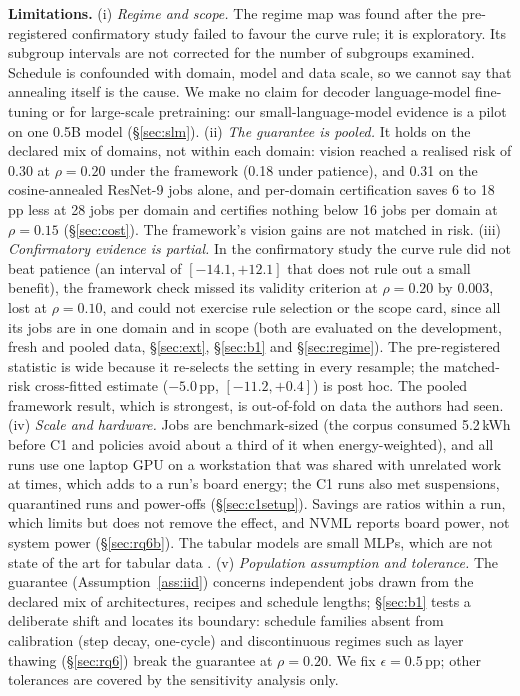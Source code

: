 \documentclass[3p,twocolumn,10pt]{elsarticle}
\theoremstyle{definition}
\begin{document}
\textbf{Limitations.}
(i) \emph{Regime and scope.} The regime map was found after the pre-registered confirmatory study failed to favour the curve rule; it is exploratory. Its subgroup intervals are not corrected for the number of subgroups examined. Schedule is confounded with domain, model and data scale, so we cannot say that annealing itself is the cause. We make no claim for decoder language-model fine-tuning or for large-scale pretraining: our small-language-model evidence is a pilot on one 0.5B model (\S\ref{sec:slm}).
(ii) \emph{The guarantee is pooled.} It holds on the declared mix of domains, not within each domain: vision reached a realised risk of 0.30 at $\rho=0.20$ under the framework (0.18 under patience), and 0.31 on the cosine-annealed ResNet-9 jobs alone, and per-domain certification saves 6 to 18\,pp less at 28 jobs per domain and certifies nothing below 16 jobs per domain at $\rho=0.15$ (\S\ref{sec:cost}). The framework's vision gains are not matched in risk.
(iii) \emph{Confirmatory evidence is partial.} In the confirmatory study the curve rule did not beat patience (an interval of $[-14.1,+12.1]$ that does not rule out a small benefit), the framework check missed its validity criterion at $\rho=0.20$ by 0.003, lost at $\rho=0.10$, and could not exercise rule selection or the scope card, since all its jobs are in one domain and in scope (both are evaluated on the development, fresh and pooled data, \S\ref{sec:ext}, \S\ref{sec:b1} and \S\ref{sec:regime}). The pre-registered statistic is wide because it re-selects the setting in every resample; the matched-risk cross-fitted estimate ($-5.0$\,pp, $[-11.2,+0.4]$) is post hoc. The pooled framework result, which is strongest, is out-of-fold on data the authors had seen.
(iv) \emph{Scale and hardware.} Jobs are benchmark-sized (the corpus consumed 5.2\,kWh before C1 and policies avoid about a third of it when energy-weighted), and all runs use one laptop GPU on a workstation that was shared with unrelated work at times, which adds to a run's board energy; the C1 runs also met suspensions, quarantined runs and power-offs (\S\ref{sec:c1setup}). Savings are ratios within a run, which limits but does not remove the effect, and NVML reports board power, not system power (\S\ref{sec:rq6b}). The tabular models are small MLPs, which are not state of the art for tabular data \citep{grinsztajn2022tabular}.
(v) \emph{Population assumption and tolerance.} The guarantee (Assumption~\ref{ass:iid}) concerns independent jobs drawn from the declared mix of architectures, recipes and schedule lengths; \S\ref{sec:b1} tests a deliberate shift and locates its boundary: schedule families absent from calibration (step decay, one-cycle) and discontinuous regimes such as layer thawing (\S\ref{sec:rq6}) break the guarantee at $\rho=0.20$. We fix $\epsilon=0.5$\,pp; other tolerances are covered by the sensitivity analysis only.
\end{document}

